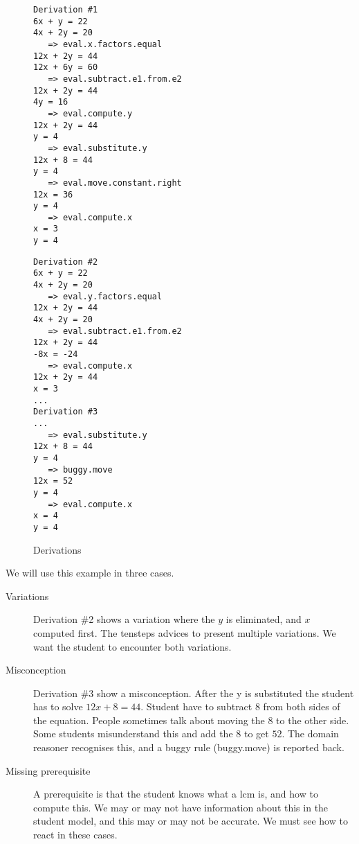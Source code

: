 \begin{figure}
\begin{minipage}[t]{7cm}
\begin{verbatim}
Derivation #1
6x + y = 22
4x + 2y = 20
   => eval.x.factors.equal
12x + 2y = 44
12x + 6y = 60
   => eval.subtract.e1.from.e2
12x + 2y = 44
4y = 16
   => eval.compute.y
12x + 2y = 44
y = 4
   => eval.substitute.y
12x + 8 = 44
y = 4
   => eval.move.constant.right
12x = 36
y = 4
   => eval.compute.x
x = 3
y = 4

\end{verbatim}
\end{minipage}
\begin{minipage}[t]{3cm}
\begin{verbatim}
Derivation #2
6x + y = 22
4x + 2y = 20
   => eval.y.factors.equal
12x + 2y = 44
4x + 2y = 20
   => eval.subtract.e1.from.e2
12x + 2y = 44
-8x = -24
   => eval.compute.x
12x + 2y = 44
x = 3
...
Derivation #3
...
   => eval.substitute.y
12x + 8 = 44
y = 4
   => buggy.move
12x = 52
y = 4
   => eval.compute.x
x = 4
y = 4

\end{verbatim}
\end{minipage}
\caption{Derivations}\label{fig:deriv}
\end{figure}

We will use this example  in three cases.

\begin{description}
\item[Variations]
Derivation \#2 shows a variation where the $y$ is eliminated, and $x$ computed first. 
The \gls{tensteps} advices to present multiple variations.
We want the student to encounter both variations.
\item[Misconception]
Derivation \#3 show a misconception.
After the y is substituted the student has to solve $ 12 x + 8 = 44$. 
Student have to subtract $8$ from both sides of the equation.
People sometimes talk about moving the $8$ to the other side.
Some students misunderstand this and add the $8$ to get $52$.
The domain reasoner recognises this, and a buggy rule (buggy.move) is reported back.
 \item[Missing prerequisite]
A prerequisite is that the student knows what a lcm is, and how to compute this.
We may or may not have information about this in the student model, and this may or may not be accurate.
We must see how to react in these cases.

\end{description}


